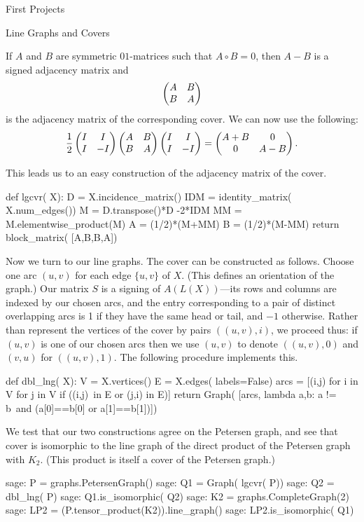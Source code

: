 \begin{chap}{First Projects}
\begin{sect}{Line Graphs and Covers}
\begin{para}
If $A$ and $B$ are symmetric $01$-matrices such that $A\circ B=0$,
then $A-B$ is a signed adjacency matrix and
\[
    \begin{pmatrix} A&B\\B&A \end{pmatrix}
\]
is the adjacency matrix of the corresponding cover.
We can now use the following:
\[
    \frac12\begin{pmatrix} I&I\\I&-I \end{pmatrix}\begin{pmatrix} A&B\\B&A \end{pmatrix}\begin{pmatrix} I&I\\I&-I \end{pmatrix}
        =\begin{pmatrix} A+B&0\\0&A-B \end{pmatrix}.
\]
\end{para}
%
\begin{para}
This leads us to an easy construction of the adjacency matrix of the cover.
\end{para}
%
\begin{sageblock}
def lgcvr( X):
    D = X.incidence_matrix()
    IDM = identity_matrix( X.num_edges())
    M = D.transpose()*D -2*IDM
    MM = M.elementwise_product(M)
    A = (1/2)*(M+MM)
    B = (1/2)*(M-MM)
    return block_matrix( [A,B,B,A])
\end{sageblock}
%
\begin{para}
Now we turn to our line graphs. The cover can be constructed as follows.
Choose one arc $(u,v)$ for each edge $\{u,v\}$ of $X$. (This defines an orientation
of the graph.) Our matrix $S$ is a signing of $A(L(X))$---its rows and columns
are indexed by our chosen arcs, and the entry corresponding to a pair
of distinct overlapping arcs is 1 if they have the same head or tail,
and $-1$ otherwise. Rather than represent the vertices of the cover by
pairs $((u,v),i)$, we proceed thus: if $(u,v)$ is one of our chosen
arcs then we use $(u,v)$ to denote $((u,v),0)$ and $(v,u)$ for $((u,v),1)$.
The following procedure implements this.
\end{para}
%
\begin{sageblock}
def dbl_lng( X):
    V = X.vertices()
    E = X.edges( labels=False)
    arcs = [(i,j) for i in V for j in V if ((i,j)\
     in E or (j,i) in E)]
    return  Graph( [arcs, lambda a,b: a != b\
     and (a[0]==b[0] or a[1]==b[1])])
\end{sageblock}
%
\begin{para}
We test that our two constructions agree on the Petersen graph, and see
that cover is isomorphic to the line graph of the direct product of
the Petersen graph with $K_2$. (This product is itself a cover of the Petersen
graph.)
\end{para}
%
\begin{sageexample}
sage: P = graphs.PetersenGraph()
sage: Q1 = Graph( lgcvr( P))
sage: Q2 = dbl_lng( P)
sage: Q1.is_isomorphic( Q2)
sage: K2 = graphs.CompleteGraph(2)
sage: LP2 = (P.tensor_product(K2)).line_graph()
sage: LP2.is_isomorphic( Q1)
\end{sageexample}
%
\end{sect}
%
\end{chap}